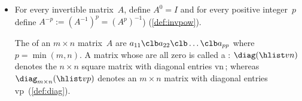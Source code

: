 \begin{itemize}
\itemme If \(A\) is an {invertible} matrix, then its  is unique, and denoted by~\(A^{-1}\) (\autoref{thm:uninv}).

\itemhi For every \(2\times2\) matrix \(A=\begin{bmat} a&b\\c&d \end{bmat}\), the matrix~\(A\) is {invertible} if and only if the  \(ad-bc\neq0\) (\autoref{thm:2x2det}), in which case
\begin{equation*}
A^{-1}=\frac1{ad-bc}\begin{bmatrix} d&-b\\-c&a \end{bmatrix}.
\end{equation*}

\itemme If a matrix~\(A\) is {invertible}, then  \(A\xv=\bv\) has the {unique solution} \(\xv=A^{-1}\bv\) for every~\(\bv\) (\autoref{thm:invuniqsol}).

\itemme For all invertible matrices~\(A\) and~\(B\), the inverse has the properties (\autoref{thm:invprop}):
\begin{itemize}
\item  matrix \(A^{-1}\) is invertible and \((A^{-1})^{-1}=A\)\,;
\item if scalar \(c\neq0\)\,, then matrix~\(cA\) is invertible and \((cA)^{-1}=\frac1cA^{-1}\);
\item matrix \(AB\) is invertible and \((AB)^{-1}=B^{-1}A^{-1}\) (remember the reversed order);
\item matrix \(\tr A\) is invertible and \((\tr A)^{-1}=\tr{(A^{-1})}\);
\item matrices \(A^p\) are invertible for all \(p=1,2,3,\ldots\) and \((A^p)^{-1}=(A^{-1})^p\).
\end{itemize}

\item For every {invertible} matrix~\(A\), define \(A^0=I\) and for every positive integer~\(p\) define \(A^{-p}:=(A^{-1})^p=(A^p)^{-1}\)) (\autoref{def:invpow}).

\itemhi The  of an \(m\times n\) matrix~\(A\) are  \(a_{11}\clb a_{22}\clb \ldots\clb a_{pp}\) where \(p=\min(m,n)\).
A matrix whose  are all zero is called a : \(\diag(\hlist vn)\) denotes the \(n\times n\) square matrix with diagonal entries \hlist vn\,; whereas \(\diag_{m\times n}(\hlist vp)\) denotes an \(m\times n\) matrix with diagonal entries \hlist vp\ (\autoref{def:diag}).


\end{itemize}
